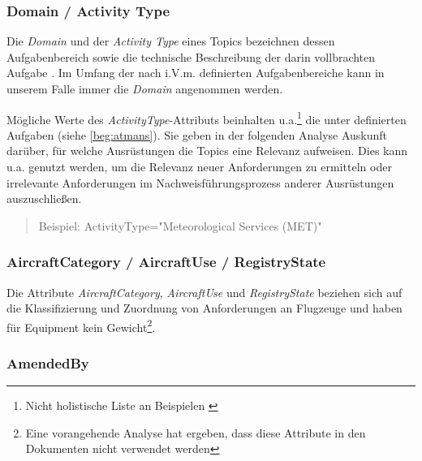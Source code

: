     
    \subsubsection{Domain / Activity Type}

Die \textit{Domain} und der \textit{Activity Type} eines Topics bezeichnen dessen Aufgabenbereich sowie die technische Beschreibung der darin vollbrachten Aufgabe \cite[S. 18]{easa_xml_doc}.
Im Umfang der nach  i.V.m.  definierten Aufgabenbereiche kann in unserem Falle immer die \textit{Domain} \atmans angenommen werden.

Mögliche Werte des \textit{ActivityType}-Attributs beinhalten u.a.\footnote{Nicht holistische Liste an Beispielen \cite[vgl.][S.18 -- 19]{easa_xml_doc}} die unter \atmans definierten Aufgaben (siehe \ref{beg:atmans}).
Sie geben in der folgenden Analyse Auskunft darüber, für welche \atmans Ausrüstungen die Topics eine Relevanz aufweisen.
Dies kann u.a. genutzt werden, um die Relevanz neuer Anforderungen zu ermitteln oder irrelevante Anforderungen im Nachweisführungsprozess anderer Ausrüstungen auszuschließen.  

\begin{quote}
    Beispiel:
    \textsf{ActivityType="Meteorological Services (MET)"}
\end{quote}
   
    \subsubsection{AircraftCategory / AircraftUse / RegistryState}

Die Attribute \textit{AircraftCategory}, \textit{AircraftUse} und \textit{RegistryState} beziehen sich auf die Klassifizierung und Zuordnung von Anforderungen an Flugzeuge und haben für \atmans Equipment kein Gewicht\footnote{Eine vorangehende Analyse hat ergeben, dass diese Attribute in den \atmans Dokumenten nicht verwendet werden}. \cite[20, 21, 26]{easa_xml_doc}
    
    \subsubsection{AmendedBy}

